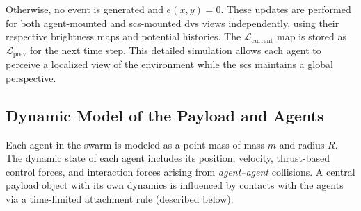 Otherwise, no event is generated and $e(x,y) = 0$. These updates are performed for both agent-mounted and \ac{scs}-mounted \ac{dvs} views independently, using their respective brightness maps and potential histories. The $\mathcal{L}_{\text{current}}$ map is stored as $\mathcal{L}_{\text{prev}}$ for the next time step. This detailed simulation allows each agent to perceive a localized view of the environment while the \ac{scs} maintains a global perspective. 




\subsection{Dynamic Model of the Payload and Agents} 
\label{sec:agent_dynamics}

Each agent in the swarm is modeled as a point mass of mass \( m \) and radius \(R\). The dynamic state of each agent includes its position, velocity, thrust-based control forces, and interaction forces arising from \emph{agent--agent} collisions. A central payload object with its own dynamics is influenced by contacts with the agents via a time-limited attachment rule (described below).


